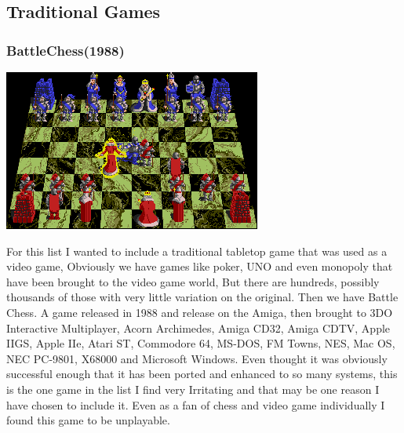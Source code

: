 \documentclass{article}
\begin{document}
\subsection{Traditional Games}

\subsubsection{BattleChess(1988)}

\begin{minipage}{0.43\textwidth}
\includegraphics[width=\linewidth]{battlechess}
\end{minipage} \hfill
\begin{minipage}{0.55\textwidth}\raggedright
For this list I wanted to include a traditional tabletop game that was used as a video game, Obviously we have games like poker, UNO and even monopoly that have been brought to the video game world, But there are hundreds, possibly thousands of those with very little variation on the original. Then we have Battle Chess. A game released in 1988 and release on the Amiga, then brought to  3DO Interactive Multiplayer, Acorn Archimedes, Amiga CD32, Amiga CDTV, Apple IIGS, Apple IIe, Atari ST, Commodore 64, MS-DOS, FM Towns, NES, Mac OS, NEC PC-9801, X68000 and Microsoft Windows. Even thought it was obviously successful enough that it has been ported and enhanced to so many systems, this is the one game in the list I find very Irritating and that may be one reason I have chosen to include it. Even as a fan of chess and video game individually I found this game to be unplayable.
\end{minipage} \newline
\end{document}
